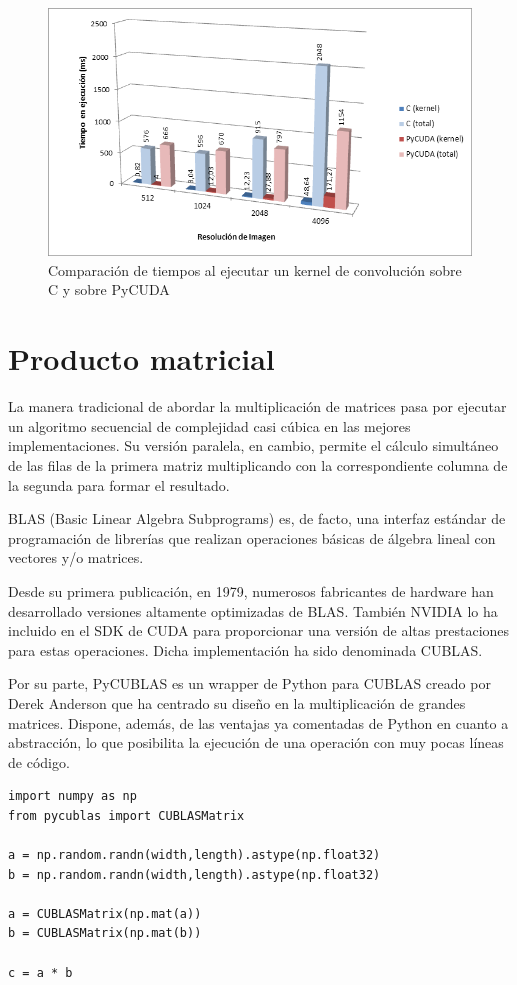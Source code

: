 \documentclass[twocolumn,twoside]{Jornadas}
\begin{document}
\begin{figure}
   \begin{center}
      \includegraphics[width=.5\textwidth]{overhead-convolucion.png}
      \caption{\label{fig:overhead-convolucion}Comparación de tiempos al ejecutar un kernel de convolución sobre C y sobre PyCUDA}
   \end{center}
\end{figure}

\section{Producto matricial}

La manera tradicional de abordar la multiplicación de matrices pasa por ejecutar un algoritmo secuencial de complejidad casi cúbica en las mejores implementaciones. Su versión paralela, en cambio, permite el cálculo simultáneo de las filas de la primera matriz multiplicando con la correspondiente columna de la segunda para formar el resultado.

BLAS (Basic Linear Algebra Subprograms) es, de facto, una interfaz estándar de programación de librerías que realizan operaciones básicas de álgebra lineal con vectores y/o matrices.

Desde su primera publicación, en 1979, numerosos fabricantes de hardware han desarrollado versiones altamente optimizadas de BLAS. También NVIDIA lo ha incluido en el SDK de CUDA para proporcionar una versión de altas prestaciones para estas operaciones. Dicha implementación ha sido denominada CUBLAS.

Por su parte, PyCUBLAS es un wrapper \cite{pycublas} de Python para CUBLAS creado por Derek Anderson que ha centrado su diseño en la multiplicación de grandes matrices. Dispone, además, de las ventajas ya comentadas de Python en cuanto a abstracción, lo que posibilita la ejecución de una operación con muy pocas líneas de código.

\begin{verbatim}
import numpy as np
from pycublas import CUBLASMatrix

a = np.random.randn(width,length).astype(np.float32)
b = np.random.randn(width,length).astype(np.float32)

a = CUBLASMatrix(np.mat(a))
b = CUBLASMatrix(np.mat(b))

c = a * b
\end{verbatim}
\end{document}
